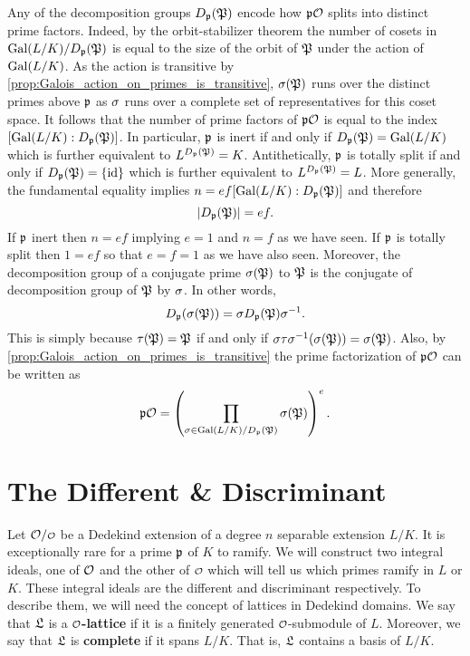     Any of the decomposition groups $D_{\mathfrak{p}}(\mathfrak{P})$ encode how $\mathfrak{p}\mathcal{O}$ splits into distinct prime factors. Indeed, by the orbit-stabilizer theorem the number of cosets in $\operatorname{\mathrm{Gal}}(L/K)/D_{\mathfrak{p}}(\mathfrak{P})$ is equal to the size of the orbit of $\mathfrak{P}$ under the action of $\operatorname{\mathrm{Gal}}(L/K)$. As the action is transitive by \cref{prop:Galois_action_on_primes_is_transitive}, $\sigma(\mathfrak{P})$ runs over the distinct primes above $\mathfrak{p}$ as $\sigma$ runs over a complete set of representatives for this coset space. It follows that the number of prime factors of $\mathfrak{p}\mathcal{O}$ is equal to the index $[\operatorname{\mathrm{Gal}}(L/K):D_{\mathfrak{p}}(\mathfrak{P})]$. In particular, $\mathfrak{p}$ is inert if and only if $D_{\mathfrak{p}}(\mathfrak{P}) = \operatorname{\mathrm{Gal}}(L/K)$ which is further equivalent to $L^{D_{\mathfrak{p}}(\mathfrak{P})} = K$. Antithetically, $\mathfrak{p}$ is totally split if and only if $D_{\mathfrak{p}}(\mathfrak{P}) = \{\operatorname{\textrm{id}}\}$ which is further equivalent to $L^{D_{\mathfrak{p}}(\mathfrak{P})} = L$. More generally, the fundamental equality implies $n = ef[\operatorname{\mathrm{Gal}}(L/K):D_{\mathfrak{p}}(\mathfrak{P})]$ and therefore
    \[
      |D_{\mathfrak{p}}(\mathfrak{P})| = ef.
    \]
    If $\mathfrak{p}$ inert then $n = ef$ implying $e = 1$ and $n = f$ as we have seen. If $\mathfrak{p}$ is totally split then $1 = ef$ so that $e = f = 1$ as we have also seen. Moreover, the decomposition group of a conjugate prime $\sigma(\mathfrak{P})$ to $\mathfrak{P}$ is the conjugate of decomposition group of $\mathfrak{P}$ by $\sigma$. In other words,
    \[
      D_{\mathfrak{p}}(\sigma(\mathfrak{P})) = \sigma D_{\mathfrak{p}}(\mathfrak{P})\sigma^{-1}.
    \]
    This is simply because $\tau(\mathfrak{P}) = \mathfrak{P}$ if and only if $\sigma\tau\sigma^{-1}(\sigma(\mathfrak{P})) = \sigma(\mathfrak{P})$. Also, by \cref{prop:Galois_action_on_primes_is_transitive} the prime factorization of $\mathfrak{p}\mathcal{O}$ can be written as
    \[
      \mathfrak{p}\mathcal{O} = \left(\prod_{\sigma \in \operatorname{\mathrm{Gal}}(L/K)/D_{\mathfrak{p}}(\mathfrak{P})}\sigma(\mathfrak{P})\right)^{e}.
    \]
  \section{The Different \& Discriminant}
    Let $\mc{O}/\smc{O}$ be a Dedekind extension of a degree $n$ separable extension $L/K$. It is exceptionally rare for a prime $\mathfrak{p}$ of $K$ to ramify. We will construct two integral ideals, one of $\mathcal{O}$ and the other of $\smc{O}$ which will tell us which primes ramify in $L$ or $K$. These integral ideals are the different and discriminant respectively. To describe them, we will need the concept of lattices in Dedekind domains. We say that $\mathfrak{L}$ is a \textbf{$\smc{O}$-lattice} if it is a finitely generated $\smc{O}$-submodule of $L$. Moreover, we say that $\mathfrak{L}$ is \textbf{complete} if it spans $L/K$. That is, $\mathfrak{L}$ contains a basis of $L/K$.

